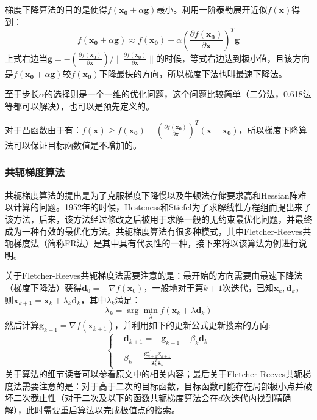 梯度下降算法的目的是使得$f(\bm{x_0}+\alpha \bm{g})$最小。利用一阶泰勒展开近似$f(\bm{x})$得到：
\begin{equation}
\label{Gradient_Descend}
f(\bm{x_0}+\alpha \bm{g}) \approx f(\bm{x_0})+\alpha\left(\frac{\partial f(\bm{x_0})}{\partial \bm{x}}\right)^{T}\bm{g}
\end{equation}
上式右边当$\bm{g}=-\left(\frac{\partial f(\bm{x_0})}{\partial \bm{x}}\right)/\|\frac{\partial f(\bm{x_0})}{\partial \bm{x}}\|$的时候，等式右边达到极小值，且该方向是$f(\bm{x_0}+\alpha \bm{g})$较$f(\bm{x_0})$下降最快的方向，所以梯度下法也叫最速下降法。

至于步长$\alpha$的选择则是一个一维的优化问题，这个问题比较简单（二分法，0.618法等都可以解决），也可以是预先定义的。

对于凸函数由于有：$f(\bm{x})\geq f(\bm{x_0})+\left(\frac{\partial f(\bm{x_0})}{\partial \bm{x}}\right)^{T}(\bm{x-x_0})$，所以梯度下降算法可以保证目标函数值是不增加的。
\subsubsection{共轭梯度算法}
共轭梯度算法的提出是为了克服梯度下降慢以及牛顿法存储要求高和Hessian阵难以计算的问题。1952年的时候，Hesteness和Stiefel为了求解线性方程组而提出来了该方法，后来，该方法经过修改之后被用于求解一般的无约束最优化问题，并最终成为一种有效的最优化方法。共轭梯度算法有很多种模式，其中Fletcher-Reeves共轭梯度法\cite{Conjugate_Gradient_FR}（简称FR法）是其中具有代表性的一种，接下来将以该算法为例进行说明。

关于Fletcher-Reeves共轭梯度法需要注意的是：最开始的方向需要由最速下降法（梯度下降法）获得$\bm{d}_0=-\nabla f(\bm{x}_0)$，一般地对于第$k+1$次迭代，已知$\bm{x}_k,\bm{d}_k$，则$\bm{x}_{k+1}=\bm{x}_{k}+\lambda_{k}\bm{d}_{k}$，其中$\lambda_k$满足：
\begin{equation}
\label{linear_search}
\lambda_{k}=\arg\min_{\lambda} f(\bm{x}_k+\lambda \bm{d}_{k})
\end{equation}
然后计算$\bm{g}_{k+1}=\nabla f(\bm{x}_{k+1})$，并利用如下的更新公式更新搜索的方向\cite{Conjugate_Gradient_FR}:
\begin{equation}
\label{Conjugate_Gradeint_update}
\left\{
\begin{split}
&\bm{d}_{k+1}=-\bm{g}_{k+1}+\beta_{k}\bm{d}_{k}\\
&\beta_{k}=\frac{\bm{g}_{k+1}^{T}\bm{g}_{k+1}}{\bm{g}_{k}^{T}\bm{g}_{k}}
\end{split}
\right.
\end{equation}
关于算法的细节读者可以参看原文\cite{Conjugate_Gradient_FR}中的相关内容；最后关于Fletcher-Reeves共轭梯度法需要注意的是：对于高于二次的目标函数，目标函数可能存在局部极小点并破坏二次截止性（对于二次及以下的函数共轭梯度算法会在$d$次迭代内找到精确解），此时需要重启算法以完成极值点的搜索。
